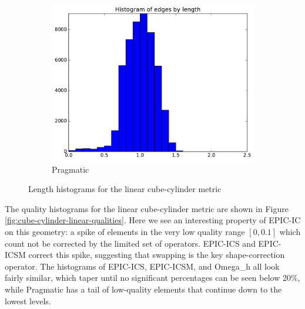 \documentclass[3p,times,procedia,number]{elsarticle}
\begin{document}
\begin{figure}
\begin{subfigure}{.24\textwidth}
\includegraphics[width=\textwidth]{pragmatic-cube-cylinder-linear-length.pdf}
\caption{Pragmatic}
\end{subfigure}
\caption{Length histograms for the linear cube-cylinder metric}
\label{fig:cube-cylinder-linear-lengths}
\end{figure}

The quality histograms for the linear cube-cylinder metric
are shown in Figure \ref{fig:cube-cylinder-linear-qualities}.
Here we see an interesting property of EPIC-IC on this geometry:
a spike of elements in the very low quality range $[0,0.1]$
which count not be corrected by the limited set of operators.
EPIC-ICS and EPIC-ICSM correct this spike, suggesting that
swapping is the key shape-correction operator.
The histograms of EPIC-ICS, EPIC-ICSM, and Omega\_h all look fairly
similar, which taper until no significant percentages can be
seen below 20\%, while Pragmatic has a tail of low-quality
elements that continue down to the lowest levels.
\end{document}
